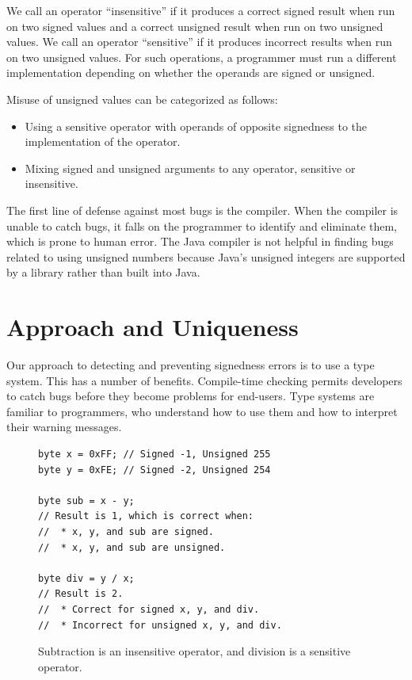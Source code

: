 \documentclass{sig-alternate-05-2015}
\begin{document}
We call an operator ``insensitive'' if it produces a correct signed result
when run on two signed values and a correct unsigned result
when run on two unsigned values.  We call an operator ``sensitive'' if it
produces incorrect results when run on two unsigned values. For such
operations, a programmer must run a different implementation depending on whether
the operands are signed or unsigned.

Misuse of unsigned values can be categorized as follows:

\begin{itemize}\itemsep 0pt \parskip 0pt
  \item Using a sensitive operator with operands of opposite signedness to the implementation of the operator.
  \item Mixing signed and unsigned arguments to any operator, sensitive or insensitive.
\end{itemize}

The first line of defense against most bugs is the compiler. When the
compiler is unable to catch bugs, it falls on the programmer to identify and
eliminate them, which is prone to human error. The Java compiler
is not helpful in finding bugs related to using unsigned
numbers because Java's unsigned
integers are supported by a library rather than built into Java.


\section{Approach and Uniqueness}

Our approach to detecting and preventing signedness errors is to use a type
system. This has a number of benefits.
%
Compile-time checking permits developers
to catch bugs before they become problems for end-users.
%
Type systems are familiar to programmers, who understand how to use them
and how to interpret their warning messages.


\iffalse

\begin{figure}[t]
\vspace{-10pt}
\begin{lstlisting}
byte x = 0xFF; // Signed -1, Unsigned 255
byte y = 0xFE; // Signed -2, Unsigned 254

byte sub = x - y;
// Result is 1, which is correct when:
//  * x, y, and sub are signed.
//  * x, y, and sub are unsigned.

byte div = y / x;
// Result is 2.
//  * Correct for signed x, y, and div.
//  * Incorrect for unsigned x, y, and div.
\end{lstlisting}
\vspace{-10pt}
\caption{Subtraction is an insensitive operator, and
  division is a sensitive operator.}
\label{fig:operators}
\end{figure}
\end{document}
